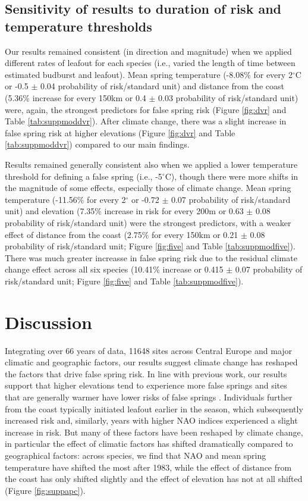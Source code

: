 \documentclass{article}\usepackage[]{graphicx}\usepackage[]{color}
\begin{document}
\subsection*{Sensitivity of results to duration of risk and temperature thresholds}
Our results remained consistent (in direction and magnitude) when we applied different rates of leafout for each species (i.e., varied the length of time between estimated budburst and leafout). Mean spring temperature (-8.08\% for every 2$^\circ$C or -0.5 $\pm$ 0.04 probability of risk/standard unit) and distance from the coast (5.36\% increase for every 150km or 0.4 $\pm$ 0.03 probability of risk/standard unit) were, again, the strongest predictors for false spring risk (Figure \ref{fig:dvr} and Table \ref{tab:suppmoddvr}). After climate change, there was a slight increase in false spring risk at higher elevations (Figure \ref{fig:dvr} and Table \ref{tab:suppmoddvr}) compared to our main findings. 

Results remained generally consistent also when we applied a lower temperature threshold for defining a false spring (i.e., -5$^{\circ}$C), though there were more shifts in the magnitude of some effects, especially those of climate change. Mean spring temperature (-11.56\% for every 2$^\circ$ or -0.72 $\pm$ 0.07 probability of risk/standard unit) and elevation (7.35\% increase in risk for every 200m or 0.63 $\pm$ 0.08 probability of risk/standard unit) were the strongest predictors, with a weaker effect of distance from the coast (2.75\% for every 150km or 0.21 $\pm$ 0.08 probability of risk/standard unit; Figure \ref{fig:five} and Table \ref{tab:suppmodfive}). There was much greater increasse in false spring risk due to the residual climate change effect across all six species (10.41\% increase or 0.415 $\pm$ 0.07 probability of risk/standard unit; Figure \ref{fig:five} and Table \ref{tab:suppmodfive}). 

\section*{Discussion}
Integrating over 66 years of data, 11648 sites across Central Europe and major climatic and geographic factors, our results suggest climate change has reshaped the factors that drive false spring risk. In line with previous work, our results support that higher elevations tend to experience more false springs \citep{Vitasse2018, Vitra2017} and sites that are generally warmer have lower risks of false springs \citep{Wypych2016}. Individuals further from the coast typically initiated leafout earlier in the season, which subsequently increased risk and, similarly, years with higher NAO indices experienced a slight increase in risk. But many of these factors have been reshaped by climate change, in particular the effect of climatic factors has shifted dramatically compared to geographical factors: across species, we find that NAO and mean spring temperature have shifted the most after 1983, while the effect of distance from the coast has only shifted slightly and the effect of elevation has not at all shifted (Figure \ref{fig:suppapc}). 
\end{document}
